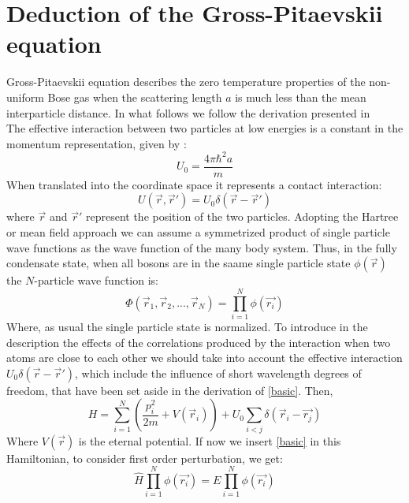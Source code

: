 \documentclass[a4paper,10pt]{article}
\title{}
\author{Carlos Lopetegui, Ayoub Ouazzani, Matteo Vilucchio}
\date{\today}
\begin{document}
\maketitle
\section{Deduction of the Gross-Pitaevskii equation}
Gross-Pitaevskii equation describes the zero temperature properties of the non-uniform Bose gas when the scattering length $a$ is much less than the mean interparticle distance. In what follows we follow the derivation presented in \cite{petchik} \\
The effective interaction between two particles at low energies is a constant in the momentum representation, given by :
\begin{equation}
 U_0=\frac{4 \pi \hbar^2a}{m}
\end{equation}
When translated into the coordinate space it represents a contact interaction:
\begin{equation}
 U(\vec{r},\vec{r}')=U_0 \delta(\vec{r}-\vec{r}')
\end{equation}
where $\vec{r}$ and $\vec{r}'$ represent the position of the two particles. Adopting the Hartree or mean field approach we can assume a symmetrized product of single particle wave functions as the wave function of the many body system. Thus, in the fully condensate state, when all bosons are in the saame single particle state $\phi(\vec{r})$ the $N$-particle wave function is:
\begin{equation} \label{basic}
 \Phi(\vec{r}_1,\vec{r}_2,...,\vec{r}_N)=\prod_{i=1}^{N}\phi(\vec{r_i})
\end{equation}
Where, as usual the single particle state is normalized. 
To introduce in the description the effects of the correlations produced by the interaction when two atoms are close to each other  we should take into account the effective interaction $U_0\delta{(\vec{r}-\vec{r}')}$, which include the influence of short wavelength degrees of freedom, that have been set aside in the derivation of \ref{basic}. Then, 
\begin{equation}
 H=\sum_{i=1}^N \left(\frac{p_i^2}{2m}+V(\vec{r}_i)\right)+U_0\sum_{i<j}\delta(\vec{r}_i-\vec{r_j})
\end{equation}
Where $V(\vec{r})$ is the eternal potential. If now we insert \ref{basic} in this Hamiltonian, to consider first order perturbation, we get:
\begin{equation}
 \hat{H}\prod_{i=1}^{N}\phi(\vec{r_i})=E \prod_{i=1}^{N}\phi(\vec{r_i})
\end{equation}
\end{document}
